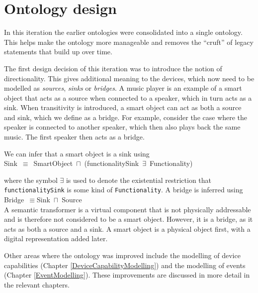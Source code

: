 \section{Ontology design}
\label{OntologyDesign3}

In this iteration the earlier ontologies were consolidated into a single ontology. This helps make the ontology more manageable and removes the ``cruft'' of legacy statements that build up over time. 

The first design decision of this iteration was to introduce the notion of directionality. This gives additional meaning to the devices, which now need to be modelled as \emph{sources}, \emph{sinks} or \emph{bridges}. A music player is an example of a smart object that acts as a source when connected to a speaker, which in turn acts as a sink. When transitivity is introduced, a smart object can act as both a source and sink, which we define as a bridge. For example, consider the case where the speaker is connected to another speaker, which then also plays back the same music. The first speaker then acts as a bridge.

We can infer that a smart object is a sink using\\

\noindent Sink~\ensuremath{\equiv}~SmartObject~\ensuremath{\sqcap}~(functionalitySink~\ensuremath{\exists}~Functionality)\\ 

where the symbol \ensuremath{\exists} is used to denote the existential restriction that \texttt{functionalitySink} is some kind of \texttt{Functionality}. A bridge is inferred using\\

\noindent Bridge~\ensuremath{\equiv}Sink~\ensuremath{\sqcap}~Source\\ 

A semantic transformer is a virtual component that is not physically addressable and is therefore not considered to be a smart object. However, it is a bridge, as it acts as both a source and a sink. A smart object is a physical object first, with a digital representation added later.

Other areas where the ontology was improved include the modelling of device capabilities (Chapter \ref{DeviceCapabilityModelling}) and the modelling of events (Chapter \ref{EventModelling}). These improvements are discussed in more detail in the relevant chapters. 


